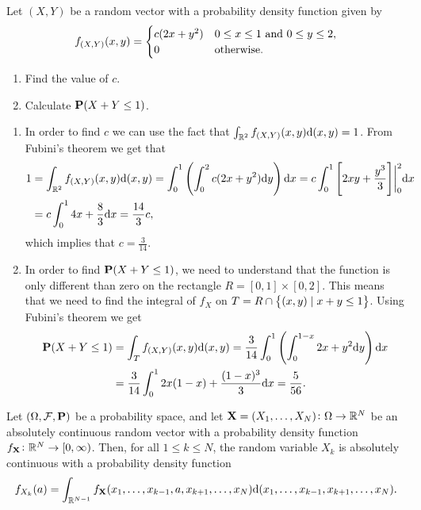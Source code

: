 \documentclass[11pt,a4paper]{article}
\begin{document}
\begin{exercise}
  Let $(X,Y)$ be a random vector with a probability density function
  given by
  \[
    f_{(X,Y)}(x,y) =
    \begin{cases}
      c(2x+y^2) & 0 \le x \le 1 \text{ and } 0 \le y \le 2, \\
      0 &\text{otherwise}.
    \end{cases}
  \]
  \begin{enumerate}
    \item[(1)] Find the value of $c$.
    \item[(2)] Calculate $\mathbf{P}(X + Y \le 1)$.
  \end{enumerate}
\end{exercise}
\begin{solution}
  \begin{enumerate} \phantom{}
    \item[(1)]
  In order to find $c$ we can use the fact that 
  $\int_{\mathbb{R}^2} f_{(X,Y)}(x,y) \mathrm{d} (x,y) = 1$.
  From Fubini's theorem we get that
  \begin{align*}
    1 &= \int_{\R^2} f_{(X,Y)}(x,y) \dif(x,y)
    = \int_{0}^{1}\left(\int_{0}^{2} c(2x + y^2) \dy\right) \dx
    = c \int_{0}^{1} \left[2xy + \frac{y^3}{3}\right]\biggr\vert^2_0 \dx \\
    &= c \int_{0}^{1} 4x + \frac{8}{3} \dx
    = \frac{14}{3}c,
  \end{align*}
  which implies that $c = \frac{3}{14}$.
    \item[(2)]
  In order to find $\mathbf{P}(X + Y \le 1)$,
  we need to understand that the function is only different than zero
  on the rectangle $R = [0,1] \times [0,2]$.
  This means that we need to find the integral of $f_X$ on 
  $T = R \cap \left\{(x,y) \mid x + y \le 1\right\}$. 
  Using Fubini's theorem we get
  \begin{align*}
    \Prob(X + Y \le 1) &= \int_{T}f_{(X,Y)} (x,y) \dif (x,y)
    = \frac{3}{14} \int_{0}^{1} 
    \left(\int_{0}^{1-x} 2x + y^2 \dy\right) \dx \\
    &= {\frac{3}{14}}\int_{0}^{1}2x(1-x)+{\frac{(1-x)^{3}}{3}} \dx
    = {\frac{5}{56}}.
  \end{align*}
  \end{enumerate}
\end{solution}

\begin{theorem}\label{thm:randvec}
  Let $(\Omega, \mathcal F, \mathbf{P})$ be a probability space, 
  and let $\boldsymbol{\mathbf{X}} = (X_1,\dots,X_N) \colon \Omega \to \mathbb{R}^N$ be an absolutely
  continuous random vector with a probability density function 
  $f_{\boldsymbol{\mathbf{X}}} \colon \mathbb{R}^N \to [0,\infty)$.
  Then, for all $1 \le k \le N$,
  the random variable $X_k$ is absolutely continuous
  with a probability density function
  \[
    f_{X_{k}}(a) = 
    \int_{\mathbb{R}^{N-1}} 
    f_{\boldsymbol{\mathbf{X}}}(x_{1},\dots,x_{k-1},a,x_{k+1},\dots,x_{N})
    \mathrm{d} (x_{1},\ldots,x_{k-1},x_{k+1},\dots,x_{N}).
  \]
\end{theorem}
\end{document}
